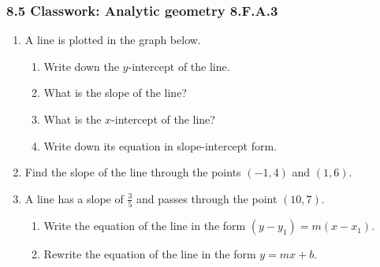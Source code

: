 

\fancyhead[LE]{\thepage}



\subsubsection*{8.5 Classwork: Analytic geometry \hfill 8.F.A.3}
\begin{enumerate}

\item A line is plotted in the graph below.
\begin{multicols}{2}
    \begin{enumerate}[itemsep=0.5cm]
      \item Write down the $y$-intercept of the line.
      \item What is the slope of the line?
      \item What is the $x$-intercept of the line?
      \item Write down its equation in slope-intercept form.
      \end{enumerate}
    \begin{flushright}
    \end{flushright}
  \end{multicols} \vspace{2cm}

\item Find the slope of the line through the points $(-1, 4)$ and $(1, 6)$. \vspace{3cm}

\item A line has a slope of $\displaystyle \frac{3}{5}$ and passes through the point $(10, 7)$. 
  \begin{enumerate}[itemsep=1cm]
      \item Write the equation of the line in the form $(y-y_1)=m(x-x_1)$.
      \item Rewrite the equation of the line in the form $y=mx+b$. \vspace{4cm}
  \end{enumerate}


\end{enumerate}
